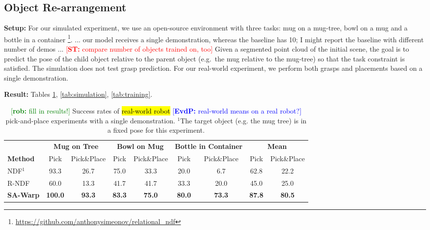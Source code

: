 \documentclass{article}
\newcommand{\evdp}[1]{\textcolor{blue}{[\textbf{EvdP:} #1]}}
\newcommand{\rob}[1]{\textcolor{green}{[\textbf{rob:} #1]}}
\newcommand{\rst}
[1]{\textcolor{red}
{[\textbf{ST:} #1]}}
\begin{document}
\subsection{Object Re-arrangement}
\label{sec:exp:rearrangement}

\textbf{Setup:} For our simulated experiment, we use an open-source environment with three tasks: mug on a mug-tree, bowl on a mug and a bottle in a  container \cite{simeonov22se}\footnote{\url{https://github.com/anthonysimeonov/relational_ndf}}. ... our model receives a single demonstration, whereas the baseline has 10; I might report the baseline with different number of demos ... \rst{compare number of objects trained on, too} Given a segmented point cloud of the initial scene, the goal is to predict the pose of the child object relative to the parent object (e.g.~the mug relative to the mug-tree) so that the task constraint is satisfied. The simulation does not test grasp prediction. For our real-world experiment, we perform both grasps and placements based on a single demonstration.

\textbf{Result:} Tables \ref{tab:real_world}, \ref{tab:simulation}, \ref{tab:training}.

\begin{table}[t!]
    \centering
    \begin{tabular}{lcccccc|cc}
         \toprule
          & \multicolumn{2}{c}{\textbf{Mug on Tree}} & \multicolumn{2}{c}{\textbf{Bowl on Mug}} & \multicolumn{2}{c}{\textbf{Bottle in Container}} & \multicolumn{2}{c}{\textbf{Mean}} \\
         \textbf{Method} & Pick & Pick\&Place & Pick & Pick\&Place & Pick & Pick\&Place & Pick & Pick\&Place \\
         \midrule
         NDF$^1$ & 93.3 & 26.7 & 75.0 & 33.3 & 20.0 & 6.7 & 62.8 & 22.2 \\
         \midrule
         R-NDF & 60.0 & 13.3 & 41.7 & 41.7 & 33.3 & 20.0 & 45.0 & 25.0 \\
         \textbf{SA-Warp} & \textbf{100.0} & \textbf{93.3} & \textbf{83.3} & \textbf{75.0} & \textbf{80.0} & \textbf{73.3} & \textbf{87.8} & \textbf{80.5} \\
         \bottomrule
    \end{tabular}
    \caption{\rob{fill in results!} Success rates of \hl{real-world robot} \evdp{real-world means on a real robot?} pick-and-place experiments with a single demonstration. $^1$The target object (e.g. the mug tree) is in a fixed pose for this experiment.}
    \label{tab:real_world}
\end{table}
\end{document}
